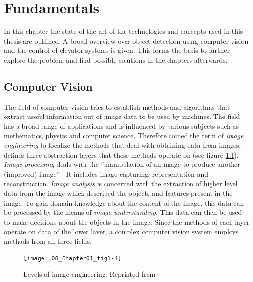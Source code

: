\chapter{Fundamentals}
\label{chap:sota}
In this chapter the state of the art of the technologies and concepts used in this thesis are outlined.
A broad overview over object detection using computer vision and the control of elevator systems is given.
This forms the basis to further explore the problem and find possible solutions in the chapters afterwards.

\section{Computer Vision}

The field of computer vision tries to establish methods and algorithms 
that extract useful information out of image data to be used by machines. 
The field has a broad range of applications and is influenced by various subjects such as methematics, physics and computer science.
Therefore \textcite{zhang2017imageprocessing} coined the term of \emph{image engineering} to localize the methods that deal with obtaining data from images. 
\textcite{zhang2017imageprocessing} defines three abstraction layers that these methods operate on (see figure \ref{fig:sota:imageengineering}).
\emph{Image processing} deals with the \enquote{manipulation of an image to produce another (improved) image} \autocite[][]{zhang2017imageprocessing}. 
It includes image capturing, representation and reconstruction.
\emph{Image analysis} is concerned with the extraction of higher level data from the image which described the objects and features present in the image.
To gain domain knowledge about the content of the image, this data can be processed by the means of \emph{image understanding}. 
This data can then be used to make decisions about the objects in the image.
Since the methods of each layer operate on data of the lower layer, a complex computer vision system employs methods from all three fields.  

\begin{figure}[hbt]
	\centering
	\texttt{[image: 08\_Chapter01\_fig1-4]}
	\caption[Levels of image engineering]{\label{fig:sota:imageengineering} Levels of image engineering. 
	Reprinted from \textcite[][Chapter~1]{zhang2017imageprocessing}}
\end{figure}

